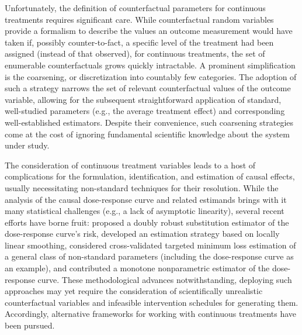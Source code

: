 Unfortunately, the definition of counterfactual parameters for continuous
treatments requires significant care. While counterfactual random variables
provide a formalism to describe the values an outcome measurement would have
taken if, possibly counter-to-fact, a specific level of the treatment had been
assigned (instead of that observed), for continuous treatments, the set of
enumerable counterfactuals grows quickly intractable. A prominent
simplification is the coarsening, or discretization into countably few
categories. The adoption of such
a strategy narrows the set of relevant counterfactual values of the outcome
variable, allowing for the subsequent straightforward application of standard,
well-studied parameters (e.g., the average treatment effect) and corresponding
well-established estimators. Despite their convenience, such coarsening
strategies come at the cost of ignoring fundamental scientific knowledge about
the system under study.

The consideration of continuous treatment variables leads to a host of
complications for the formulation, identification, and estimation of causal
effects, usually necessitating non-standard techniques for their resolution.
While the analysis of the causal dose-response curve and related estimands
brings with it many statistical challenges (e.g., a lack of asymptotic
linearity), several recent efforts have borne fruit: \citet{diaz2013targeted}
proposed a doubly robust substitution estimator of the dose-response curve's
risk, \citet{kennedy2017nonparametric} developed an estimation strategy based on
locally linear smoothing, \citet{vdl2018cvtmle} considered cross-validated
targeted minimum loss estimation of a general class of non-standard parameters
(including the dose-response curve as an example), and
\citet{westling2020causal} contributed a monotone nonparametric estimator of the
dose-response curve. These methodological advances notwithstanding, deploying
such approaches may yet require the consideration of scientifically unrealistic
counterfactual variables and infeasible intervention schedules for generating
them. Accordingly, alternative frameworks for working with continuous
treatments have been pursued.

